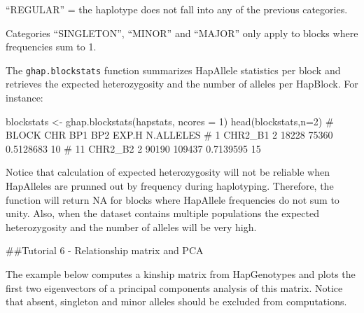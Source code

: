 \documentclass[
]{article}
\newenvironment{Shaded}{}{}
\newcommand{\CommentTok}[1]{\textcolor[rgb]{0.00,0.50,0.00}{#1}}
\newcommand{\DataTypeTok}[1]{#1}
\newcommand{\DecValTok}[1]{#1}
\newcommand{\KeywordTok}[1]{\textcolor[rgb]{0.00,0.00,1.00}{#1}}
\newcommand{\NormalTok}[1]{#1}
\newcommand{\StringTok}[1]{\textcolor[rgb]{0.00,0.50,0.50}{#1}}
\begin{document}
``REGULAR'' = the haplotype does not fall into any of the previous
categories.

Categories ``SINGLETON'', ``MINOR'' and ``MAJOR'' only apply to blocks
where frequencies sum to 1.

The \texttt{ghap.blockstats} function summarizes HapAllele statistics
per block and retrieves the expected heterozygosity and the number of
alleles per HapBlock. For instance:

\begin{Shaded}
\begin{Highlighting}[]
\NormalTok{blockstats <-}\StringTok{ }\KeywordTok{ghap.blockstats}\NormalTok{(hapstats, }\DataTypeTok{ncores =} \DecValTok{1}\NormalTok{)}
\KeywordTok{head}\NormalTok{(blockstats,}\DataTypeTok{n=}\DecValTok{2}\NormalTok{)}
\CommentTok{#        BLOCK CHR   BP1    BP2     EXP.H N.ALLELES}
\CommentTok{#   1  CHR2_B1   2 18228  75360 0.5128683        10}
\CommentTok{#   11 CHR2_B2   2 90190 109437 0.7139595        15}
\end{Highlighting}
\end{Shaded}

Notice that calculation of expected heterozygosity will not be reliable
when HapAlleles are prunned out by frequency during haplotyping.
Therefore, the function will return NA for blocks where HapAllele
frequencies do not sum to unity. Also, when the dataset contains
multiple populations the expected heterozygosity and the number of
alleles will be very high.

\pagebreak

\#\#Tutorial 6 - Relationship matrix and PCA

The example below computes a kinship matrix from HapGenotypes and plots
the first two eigenvectors of a principal components analysis of this
matrix. Notice that absent, singleton and minor alleles should be
excluded from computations.
\end{document}
